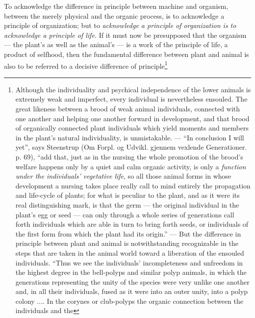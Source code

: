 \documentclass[12pt,a4paper]{book}
\begin{document}
To acknowledge the difference in principle between machine and organism, between the
merely physical and the organic
\setcounter{footnote}{0}
process, is to acknowledge a principle of organization; but to \emph{acknowledge a
principle of organization is to acknowledge a principle of life.} If it must now be
presupposed that the organism --- the plant's as well as the animal's --- is a work
of the principle of life, a product of selfhood, then the fundamental difference
between plant and animal is also to be referred to a decisive difference of
principle\footnote{Although the individuality and psychical independence of the lower
animals is extremely weak and imperfect, every individual is nevertheless ensouled.
The great likeness between a brood of weak animal individuals, connected with one
another and helping one another forward in development, and that brood of organically
connected plant individuals which yield moments and members in the plant's natural
individuality, is unmistakable. --- ``In conclusion I will yet'', says Steenstrup (Om
Forpl. og Udvikl. gjennem vexlende Generationer. p. 69), ``add that, just as in the
nursing the whole promotion of the brood's welfare happens only by a quiet and calm
organic activity, is only a \emph{function under the individuals' vegetative life},
so all those animal forms in whose development a nursing takes place really call to
mind entirely the propagation and life-cycle of plants; for what is peculiar to the
plant, and as it were its real distinguishing mark, is that the germ --- the original
individual in the plant's egg or seed --- can only through a whole series of
generations call forth individuals which are able in turn to bring forth seeds, or
individuals of the first form from which the plant had its origin.'' --- But the
difference in principle between plant and animal is notwithstanding recognizable in
the steps that are taken in the animal world toward a liberation of the ensouled
individuals. ``Thus we see the individuals' incompleteness and unfreedom in the
highest degree in the bell-polyps and similar polyp animals, in which the generations
representing the unity of the species were very unlike one another and, in all their
individuals, fused as it were into an outer unity, into a polyp colony .... In the
corynes or club-polyps the organic connection between the individuals and the
}
\end{document}
